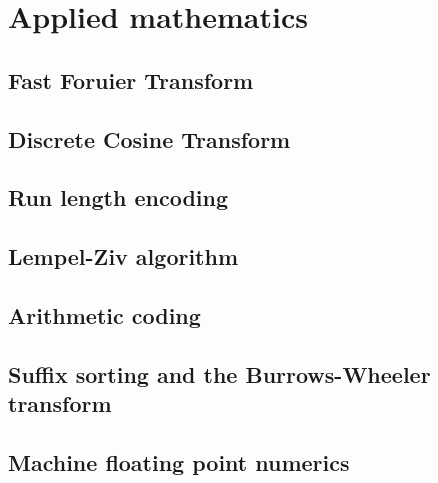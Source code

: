 
\chapter{Applied mathematics}

\section{Fast Foruier Transform}

\section{Discrete Cosine Transform}

\section{Run length encoding}

\section{Lempel-Ziv algorithm}

\section{Arithmetic coding}

\section{Suffix sorting and the Burrows-Wheeler transform}

\section{Machine floating point numerics}
